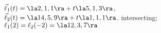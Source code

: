{$\vec\ell_1(t) = \la 2,1,1\ra + t\la 5,1,3\ra$,\\
$\vec\ell_2(t) = \la 14,5,9\ra + t\la 1,1,1\ra$.
}
{intersecting; $\ell_1(2) = \ell_2(-2) = \la 12,3,7\ra$
}

